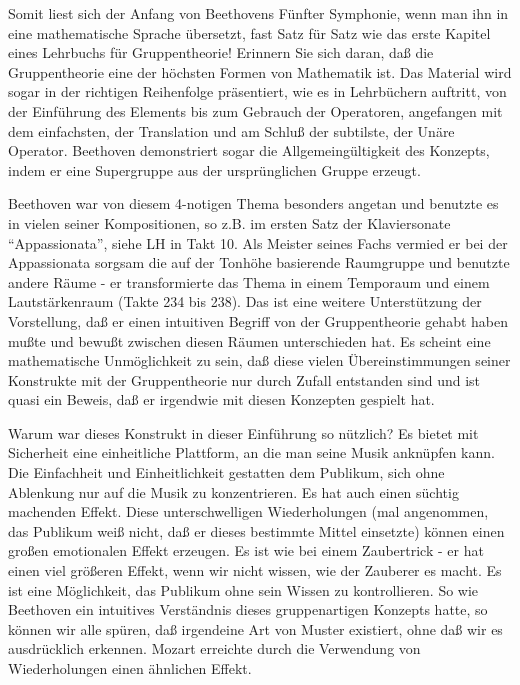Somit liest sich der Anfang von Beethovens Fünfter Symphonie, wenn man ihn in eine mathematische Sprache übersetzt, fast Satz für Satz wie das erste Kapitel eines Lehrbuchs für Gruppentheorie!
Erinnern Sie sich daran, daß die Gruppentheorie eine der höchsten Formen von Mathematik ist.
Das Material wird sogar in der richtigen Reihenfolge präsentiert, wie es in Lehrbüchern auftritt, von der Einführung des Elements bis zum Gebrauch der Operatoren, angefangen mit dem einfachsten, der Translation und am Schluß der subtilste, der Unäre Operator.
Beethoven demonstriert sogar die Allgemeingültigkeit des Konzepts, indem er eine Supergruppe aus der ursprünglichen Gruppe erzeugt.

Beethoven war von diesem 4-notigen Thema besonders angetan und benutzte es in vielen seiner Kompositionen, so z.B. im ersten Satz der Klaviersonate \enquote{Appassionata}, siehe LH in Takt 10.
Als Meister seines Fachs vermied er bei der Appassionata sorgsam die auf der Tonhöhe basierende Raumgruppe und benutzte andere Räume - er transformierte das Thema in einem Temporaum und einem Lautstärkenraum (Takte 234 bis 238).
Das ist eine weitere Unterstützung der Vorstellung, daß er einen intuitiven Begriff von der Gruppentheorie gehabt haben mußte und bewußt zwischen diesen Räumen unterschieden hat.
Es scheint eine mathematische Unmöglichkeit zu sein, daß diese vielen Übereinstimmungen seiner Konstrukte mit der Gruppentheorie nur durch Zufall entstanden sind und ist quasi ein Beweis, daß er irgendwie mit diesen Konzepten gespielt hat.

Warum war dieses Konstrukt in dieser Einführung so nützlich?
Es bietet mit Sicherheit eine einheitliche Plattform, an die man seine Musik anknüpfen kann.
Die Einfachheit und Einheitlichkeit gestatten dem Publikum, sich ohne Ablenkung nur auf die Musik zu konzentrieren.
Es hat auch einen süchtig machenden Effekt.
Diese unterschwelligen Wiederholungen (mal angenommen, das Publikum weiß nicht, daß er dieses bestimmte Mittel einsetzte) können einen großen emotionalen Effekt erzeugen.
Es ist wie bei einem Zaubertrick - er hat einen viel größeren Effekt, wenn wir nicht wissen, wie der Zauberer es macht.
Es ist eine Möglichkeit, das Publikum ohne sein Wissen zu kontrollieren.
So wie Beethoven ein intuitives Verständnis dieses gruppenartigen Konzepts hatte, so können wir alle spüren, daß irgendeine Art von Muster existiert, ohne daß wir es ausdrücklich erkennen.
Mozart erreichte durch die Verwendung von Wiederholungen einen ähnlichen Effekt.

